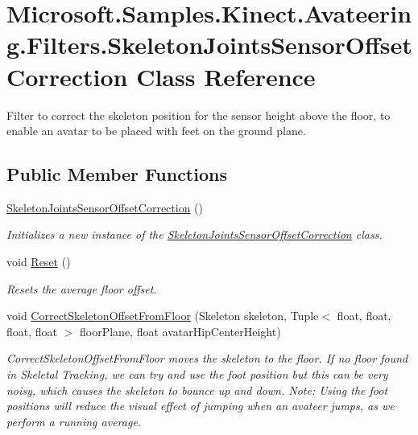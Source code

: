 \hypertarget{class_microsoft_1_1_samples_1_1_kinect_1_1_avateering_1_1_filters_1_1_skeleton_joints_sensor_offset_correction}{\section{Microsoft.\+Samples.\+Kinect.\+Avateering.\+Filters.\+Skeleton\+Joints\+Sensor\+Offset\+Correction Class Reference}
\label{class_microsoft_1_1_samples_1_1_kinect_1_1_avateering_1_1_filters_1_1_skeleton_joints_sensor_offset_correction}
}


Filter to correct the skeleton position for the sensor height above the floor, to enable an avatar to be placed with feet on the ground plane.  


\subsection*{Public Member Functions}
\begin{DoxyCompactItemize}
\item 
\hyperlink{class_microsoft_1_1_samples_1_1_kinect_1_1_avateering_1_1_filters_1_1_skeleton_joints_sensor_offset_correction_a0a219f1b8a9f7702a7965c64dfd84a6b}{Skeleton\+Joints\+Sensor\+Offset\+Correction} ()
\begin{DoxyCompactList}\small\item\em Initializes a new instance of the \hyperlink{class_microsoft_1_1_samples_1_1_kinect_1_1_avateering_1_1_filters_1_1_skeleton_joints_sensor_offset_correction}{Skeleton\+Joints\+Sensor\+Offset\+Correction} class. \end{DoxyCompactList}\item 
void \hyperlink{class_microsoft_1_1_samples_1_1_kinect_1_1_avateering_1_1_filters_1_1_skeleton_joints_sensor_offset_correction_a58aa2a575cf71b7b51ebdc8a6c156175}{Reset} ()
\begin{DoxyCompactList}\small\item\em Resets the average floor offset. \end{DoxyCompactList}\item 
void \hyperlink{class_microsoft_1_1_samples_1_1_kinect_1_1_avateering_1_1_filters_1_1_skeleton_joints_sensor_offset_correction_a878127fb5ec53cefbfd76e9afef34952}{Correct\+Skeleton\+Offset\+From\+Floor} (Skeleton skeleton, Tuple$<$ float, float, float, float $>$ floor\+Plane, float avatar\+Hip\+Center\+Height)
\begin{DoxyCompactList}\small\item\em Correct\+Skeleton\+Offset\+From\+Floor moves the skeleton to the floor. If no floor found in Skeletal Tracking, we can try and use the foot position but this can be very noisy, which causes the skeleton to bounce up and down. Note\+: Using the foot positions will reduce the visual effect of jumping when an avateer jumps, as we perform a running average. \end{DoxyCompactList}\end{DoxyCompactItemize}


